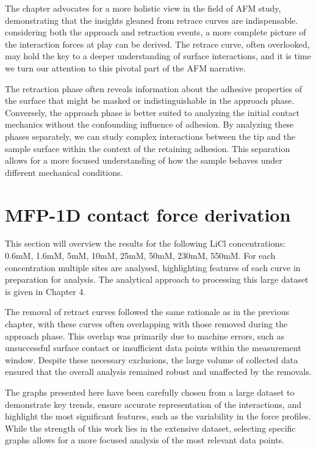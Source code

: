 The chapter advocates for a more holistic view in the field of AFM study, demonstrating that the insights gleaned from retrace curves are indispensable. considering both the approach and retraction events, a more complete picture of the interaction forces at play can be derived. The retrace curve, often overlooked, may hold the key to a deeper understanding of surface interactions, and it is time we turn our attention to this pivotal part of the AFM narrative.

The retraction phase often reveals information about the adhesive properties of the surface that might be masked or indistinguishable in the approach phase. Conversely, the approach phase is better suited to analyzing the initial contact mechanics without the confounding influence of adhesion. By analyzing these phases separately, we can study complex interactions between the tip and the sample surface within the context of the retaining adhesion. This separation allows for a more focused understanding of how the sample behaves under different mechanical conditions. \cite{BUTT20051}

\section{MFP-1D contact force derivation}

This section will overview the results for the following LiCl concentrations: 0.6mM, 1.6mM, 5mM, 10mM, 25mM, 50mM, 230mM, 550mM. For each concentration multiple sites are analysed, highlighting features of each curve in preparation for analysis. The analytical approach to processing this large dataset is given in Chapter 4. 

The removal of retract curves followed the same rationale as in the previous chapter, with these curves often overlapping with those removed during the approach phase. This overlap was primarily due to machine errors, such as unsuccessful surface contact or insufficient data points within the measurement window. Despite these necessary exclusions, the large volume of collected data ensured that the overall analysis remained robust and unaffected by the removals.

The graphs presented here have been carefully chosen from a large dataset to demonstrate key trends, ensure accurate representation of the interactions, and highlight the most significant features, such as the variability in the force profiles. While the strength of this work lies in the extensive dataset, selecting specific graphs allows for a more focused analysis of the most relevant data points.

